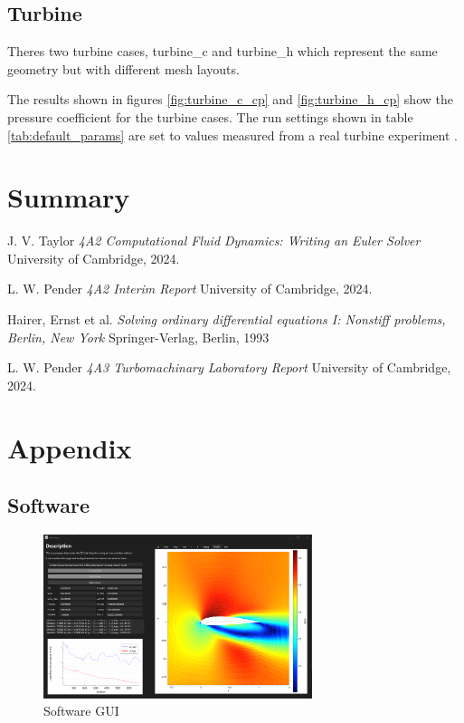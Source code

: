 \documentclass{article}
\begin{document}
\subsection{Turbine}

Theres two turbine cases, turbine\_c and turbine\_h which represent the same geometry but with different mesh layouts.


The results shown in figures \ref{fig:turbine_c_cp} and \ref{fig:turbine_h_cp} show the pressure coefficient for the turbine cases.
The run settings shown in table \ref{tab:default_params} are set to values measured from a real turbine experiment \cite{4A3_lab}.

\section{Summary}

\begin{thebibliography}{9}

    J. V. Taylor
    \emph{4A2 Computational Fluid Dynamics: Writing an Euler Solver}
    University of Cambridge,
    2024.

    L. W. Pender
    \emph{4A2 Interim Report}
    University of Cambridge,
    2024.

    Hairer, Ernst et al.
    \emph{Solving ordinary differential equations I: Nonstiff problems, Berlin, New York}
    Springer-Verlag, Berlin, 1993

    L. W. Pender
    \emph{4A3 Turbomachinary Laboratory Report}
    University of Cambridge,
    2024.
  
\end{thebibliography}

\section{Appendix}

\subsection{Software}

\begin{figure}[H]
    \centering
    \includegraphics[width=0.7\textwidth]{figures/software.png}
    \caption{Software GUI}
    \label{fig:software}
\end{figure}
\end{document}
